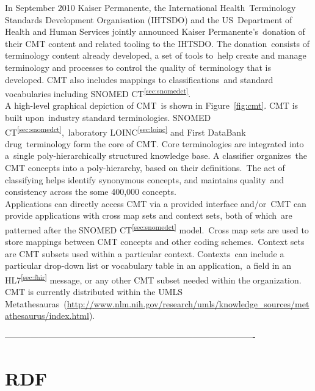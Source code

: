 \documentclass[DIV=calc, paper=a4, fontsize=12pt, onecolumn]{scrartcl}	 %
\begin{document}
  \noindent In September 2010 Kaiser Permanente, the International Health\
  Terminology Standards Development Organisation (IHTSDO) and the US\
  Department of Health and Human Services jointly announced Kaiser Permanente's\
  donation of their CMT content and related tooling to the IHTSDO. The donation\
  consists of terminology content already developed, a set of tools to\
  help create and manage terminology and processes to control the quality of\
  terminology that is developed. CMT also includes mappings to classifications\
  and standard vocabularies including SNOMED CT\textsuperscript{\ref{sec:snomedct}}.\\
  
  \noindent A high-level graphical depiction of CMT\
  is shown in Figure~\ref{fig:cmt}. CMT is built upon\
  industry standard terminologies. SNOMED CT\textsuperscript{\ref{sec:snomedct}},\
  laboratory LOINC\textsuperscript{\ref{sec:loinc}} and First DataBank drug\
  terminology form the core of CMT. Core terminologies are integrated into a\
  single poly-hierarchically structured knowledge base. A classifier organizes\
  the CMT concepts into a poly-hierarchy, based on their definitions.\
  The act of classifying helps identify synonymous concepts, and maintains quality\
  and consistency across the some 400,000 concepts.\\
  
  \noindent Applications can directly access CMT via a provided interface and/or\
  CMT can provide applications with cross map sets and context sets, both of which\
  are patterned after the SNOMED CT\textsuperscript{\ref{sec:snomedct}} model.\
  Cross map sets are used to store mappings between CMT concepts and other coding schemes.\
  Context sets are CMT subsets used within a particular context. Contexts\
  can include a particular drop-down list or vocabulary table in an application,\
  a field in an HL7\textsuperscript{\ref{sec:fhir}} message, or any other CMT subset needed within the organization.\\
  
  \noindent CMT is currently distributed within the UMLS Metathesauras\
  (\url{http://www.nlm.nih.gov/research/umls/knowledge_sources/metathesaurus/index.html}).
  
----------------------------------------------------------------------------------------


 \section[Resource Description Framework (RDF)]{RDF}
  \label{sec:rdf}
\end{document}
